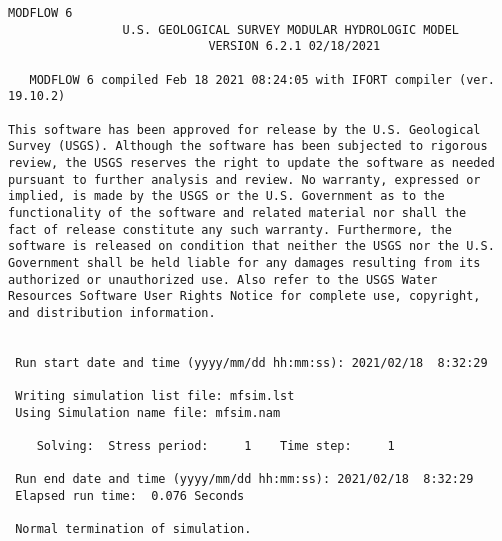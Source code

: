 {\small
\begin{lstlisting}[style=modeloutput]
                                   MODFLOW 6
                U.S. GEOLOGICAL SURVEY MODULAR HYDROLOGIC MODEL
                            VERSION 6.2.1 02/18/2021

   MODFLOW 6 compiled Feb 18 2021 08:24:05 with IFORT compiler (ver. 19.10.2)

This software has been approved for release by the U.S. Geological
Survey (USGS). Although the software has been subjected to rigorous
review, the USGS reserves the right to update the software as needed
pursuant to further analysis and review. No warranty, expressed or
implied, is made by the USGS or the U.S. Government as to the
functionality of the software and related material nor shall the
fact of release constitute any such warranty. Furthermore, the
software is released on condition that neither the USGS nor the U.S.
Government shall be held liable for any damages resulting from its
authorized or unauthorized use. Also refer to the USGS Water
Resources Software User Rights Notice for complete use, copyright,
and distribution information.


 Run start date and time (yyyy/mm/dd hh:mm:ss): 2021/02/18  8:32:29

 Writing simulation list file: mfsim.lst
 Using Simulation name file: mfsim.nam

    Solving:  Stress period:     1    Time step:     1

 Run end date and time (yyyy/mm/dd hh:mm:ss): 2021/02/18  8:32:29
 Elapsed run time:  0.076 Seconds

 Normal termination of simulation.

\end{lstlisting}
}
